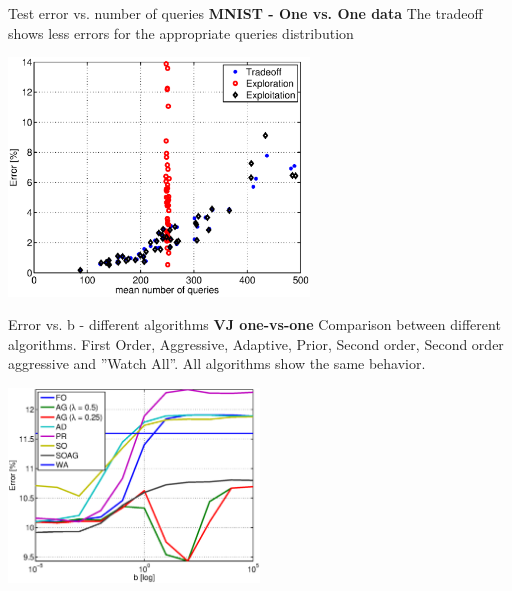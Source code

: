 \documentclass{beamer}
\begin{document}
\begin{frame}{Test error vs. number of queries}
\textbf{MNIST -  One vs. One data} \newline
The tradeoff   shows less errors for the appropriate queries distribution\newline

\begin{centering}
\includegraphics[width=0.6\textwidth]{figs/mnist2b.eps}

\end{centering}

\end{frame}


%
%
%



\begin{frame}{Error vs. b - different algorithms}
\textbf{VJ one-vs-one} \newline
Comparison between different algorithms. 
First Order, Aggressive, Adaptive, Prior, Second order, Second order aggressive and ''Watch All''.
All algorithms show the same behavior.  \newline

\begin{centering}
\includegraphics[width=0.5\textwidth]{figs/test-v1.eps}

\end{centering}

\end{frame}
\end{document}
